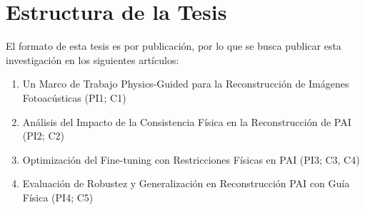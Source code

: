 \section{Estructura de la Tesis}
\label{sec:thes}

El formato de esta tesis es por publicación, por lo que se busca publicar esta investigación en los siguientes artículos:

\begin{enumerate}[start=1,label={P\arabic*:},wide = 0pt, leftmargin = 3em]
\item Un Marco de Trabajo Physics-Guided para la Reconstrucción de Imágenes Fotoacústicas (PI1; C1)
\item Análisis del Impacto de la Consistencia Física en la Reconstrucción de PAI (PI2; C2)
\item Optimización del Fine-tuning con Restricciones Físicas en PAI (PI3; C3, C4)
\item Evaluación de Robustez y Generalización en Reconstrucción PAI con Guía Física (PI4; C5)
\end{enumerate}